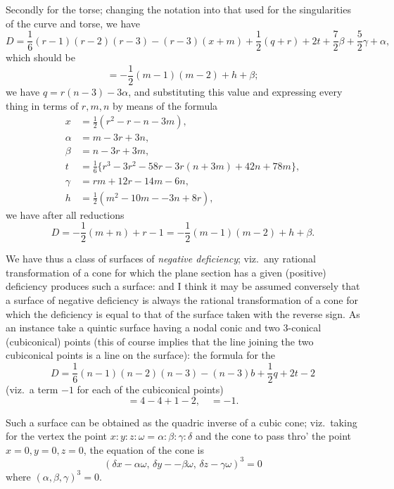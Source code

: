 \documentclass{article}
\begin{document}
Secondly for the torse; changing the notation into that used for the singularities of the curve and torse, we have
\[
D = \frac{1}{6}(r - 1)(r - 2)(r - 3) - (r - 3)(x + m) + \frac{1}{2}(q + r) + 2t + \frac{7}{2}\beta + \frac{5}{2}\gamma + \alpha,
\]
which should be
\[
= -\frac{1}{2}(m - 1)(m - 2) + h + \beta;
\]
we have $q = r(n - 3) - 3\alpha$, and substituting this value and expressing every thing in terms of $r, m, n$ by means of the formula
\[
\begin{aligned}
x &= \frac{1}{2}(r^2 - r - n - 3m), \\
\alpha &= m - 3r + 3n, \\
\beta &= n - 3r + 3m, \\
t &= \frac{1}{6}\{r^3 - 3r^2 - 58r - 3r(n + 3m) + 42n + 78m\}, \\
\gamma &= rm + 12r - 14m - 6n, \\
h &= \frac{1}{2}(m^2 - 10m -- 3n + 8r),
\end{aligned}
\]
we have after all reductions
\[
D = -\frac{1}{2}(m + n) + r - 1 = -\frac{1}{2}(m - 1)(m - 2) + h + \beta.
\]

We have thus a class of surfaces of \emph{negative deficiency}; viz.\ any rational transformation of a cone for which the plane section has a given (positive) deficiency produces such a surface: and I think it may be assumed conversely that a surface of negative deficiency is always the rational transformation of a cone for which the deficiency is equal to that of the surface taken with the reverse sign. As an instance take a quintic surface having a nodal conic and two 3-conical (cubiconical) points (this of course implies that the line joining the two cubiconical points is a line on the surface): the formula for the
\[
D = \frac{1}{6}(n - 1)(n - 2)(n - 3) - (n - 3)b + \frac{1}{2}q + 2t - 2
\]
(viz.\ a term $-1$ for each of the cubiconical points)
\[
= 4 - 4 + 1 - 2, \quad = -1.
\]

Such a surface can be obtained as the quadric inverse of a cubic cone; viz.\ taking for the vertex the point $x : y : z : \omega = \alpha : \beta : \gamma : \delta$ and the cone to pass thro' the point $x = 0, y = 0, z = 0$, the equation of the cone is
\[
(\delta x - \alpha\omega, \, \delta y -- \beta\omega, \, \delta z - \gamma\omega)^3 = 0
\]
where $(\alpha, \beta, \gamma)^3 = 0$.
\end{document}

